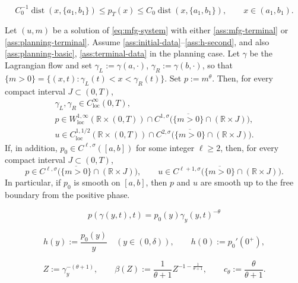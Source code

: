 \documentclass[10pt,a4paper]{amsart}
\newcommand{\R}{\mathbb R}
\newcommand{\loc}{\mathrm{loc}}
\begin{document}
\begin{equation}
\label{ass:terminal-data}
        C_0^{-1}\operatorname{dist}(x,\{a_1,b_1\})
        \le p_T(x)\le
        C_0\operatorname{dist}(x,\{a_1,b_1\}),
        \qquad x\in(a_1,b_1).
\end{equation}

\begin{theorem}
\label{thm:higher-boundary-regularity}
Let \((u,m)\) be a solution of \eqref{eq:mfg-system} with either
\eqref{ass:mfg-terminal} or \eqref{ass:planning-terminal}. Assume
\eqref{ass:initial-data}--\eqref{ass:h-second}, and also
\eqref{ass:planning-basic}, \eqref{ass:terminal-data} in the planning case.
Let \(\gamma\) be the Lagrangian flow and set
\(\gamma_L:=\gamma(a,\cdot)\), \(\gamma_R:=\gamma(b,\cdot)\), so that
\(\{m>0\}=\{(x,t):\gamma_L(t)<x<\gamma_R(t)\}\). Set \(p:=m^\theta\). Then,
for every compact interval \(J\subset(0,T)\),
\[
\begin{gathered}
        \gamma_L,\gamma_R\in C^\infty_{\loc}(0,T),\\
        p\in W^{1,\infty}_{\loc}(\R\times(0,T))
          \cap C^{1,\sigma}\bigl(\overline{\{m>0\}}\cap(\R\times J)\bigr),\\
        u\in C^{1,1/2}_{\loc}(\R\times(0,T))
          \cap C^{2,\sigma}\bigl(\overline{\{m>0\}}\cap(\R\times J)\bigr).
\end{gathered}
\]
If, in addition, \(p_0\in C^{\ell,\sigma}([a,b])\) for some integer
\(\ell\ge2\), then, for every compact interval
\(J\subset(0,T)\),
\[
        p\in
        C^{\ell,\sigma}\bigl(\overline{\{m>0\}}\cap(\R\times J)\bigr),
        \qquad
        u\in
        C^{\ell+1,\sigma}\bigl(\overline{\{m>0\}}\cap(\R\times J)\bigr).
\]
In particular, if \(p_0\) is smooth on \([a,b]\), then \(p\) and \(u\) are
smooth up to the free boundary from the positive phase.
\end{theorem}

\begin{equation}
\label{eq:mass-relation}
        p(\gamma(y,t),t)=p_0(y)\gamma_y(y,t)^{-\theta}
\end{equation}

\begin{equation}
\label{eq:h-def}
        h(y):=\frac{p_0(y)}{y}\quad(y\in(0,\delta)),\qquad
        h(0):=p_0'(0^+),
\end{equation}

\begin{equation}
\label{eq:Z-def}
        Z:=\gamma_y^{-(\theta+1)},\qquad
        \beta(Z):=\frac1{\theta+1}Z^{-1-\frac1{\theta+1}},\qquad
        c_\theta:=\frac{\theta}{\theta+1} .
\end{equation}
\end{document}

